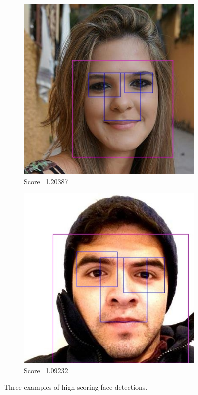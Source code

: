 \begin{figure}
\begin{subfigure}[b]{0.3\textwidth}
      \includegraphics[width=\textwidth]{figures/results/detected_50508cb1-814e-4374-bf07-cef5c301c3c0}
      \caption{Score=1.20387}
      \label{fig:results:fd:good_detected2}
    \end{subfigure}
    \begin{subfigure}[b]{0.3\textwidth}
      \includegraphics[width=\textwidth]{figures/results/detected_da153846-1afe-4b36-880a-bf8764bfd935}
      \caption{Score=1.09232}
      \label{fig:results:fd:good_detected3}
    \end{subfigure}
\caption{Three examples of high-scoring face detections.}
\label{fig:results:fd:good_detected}
\end{figure}

